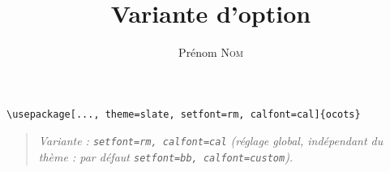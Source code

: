 \documentclass[11pt]{ocots-book}
\title{Variante d'option}
\author{Prénom \textsc{Nom}}
\newcommand{\ocotsvariantnote}[1]{\begin{quote}\itshape Variante : #1\end{quote}}
\begin{document}
\maketitle

\begin{lstlisting}
\usepackage[..., theme=slate, setfont=rm, calfont=cal]{ocots}
\end{lstlisting}
\ocotsvariantnote{\texttt{setfont=rm, calfont=cal} (r\'eglage global, ind\'ependant du th\`eme : par d\'efaut \texttt{setfont=bb, calfont=custom}).}

\end{document}
